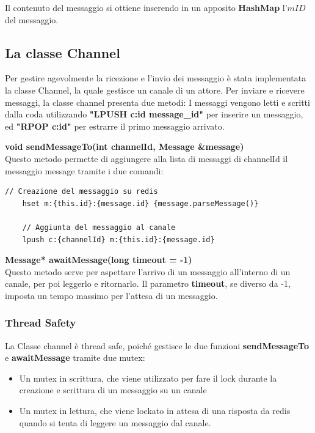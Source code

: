 \documentclass[a4paper, 11pt]{article}
\begin{document}
Il contenuto del messaggio si ottiene inserendo in un apposito \textbf{HashMap} l'$mID$ del messaggio.
\subsection{La classe Channel}
Per gestire agevolmente la ricezione e l'invio dei messaggio è stata implementata la classe Channel, la quale gestisce un canale di un attore. Per inviare e ricevere messaggi, la classe channel presenta due metodi:
I messaggi vengono letti e scritti dalla coda utilizzando \textbf{"LPUSH c:id message\_id"} per inserire un messaggio, ed \textbf{"RPOP c:id"} per estrarre il primo messaggio arrivato.

\textbf{void sendMessageTo(int channelId, Message \&message)}\\
Questo metodo permette di aggiungere alla lista di messaggi di channelId il messaggio message tramite i due comandi:

\begin{lstlisting}[style=customcpp, caption={da tower.cpp}]
    // Creazione del messaggio su redis
    hset m:{this.id}:{message.id} {message.parseMessage()}
    
    // Aggiunta del messaggio al canale
    lpush c:{channelId} m:{this.id}:{message.id} 
\end{lstlisting}

\textbf{Message* awaitMessage(long timeout = -1)}\\
Questo metodo serve per aspettare l'arrivo di un messaggio all'interno di un canale, per poi leggerlo e ritornarlo.
Il parametro \textbf{timeout}, se diverso da -1, imposta un tempo massimo per l'attesa di un messaggio.
\subsubsection{Thread Safety}

La Classe channel è thread safe, poiché gestisce le due funzioni \textbf{sendMessageTo} e \textbf{awaitMessage} tramite due mutex:
\begin{itemize}
    \item Un mutex in scrittura, che viene utilizzato per fare il lock durante la creazione e scrittura di un messaggio su un canale
    \item Un mutex in lettura, che viene lockato in attesa di una risposta da redis quando si tenta di leggere un messaggio dal canale.
\end{itemize}
\end{document}
